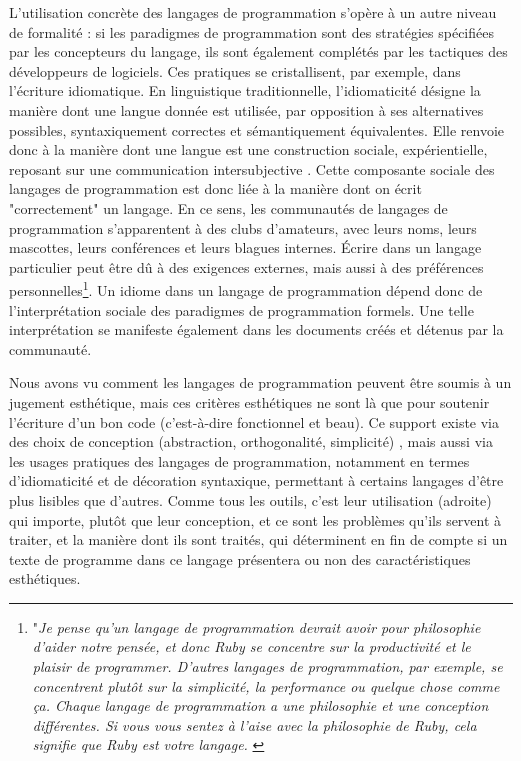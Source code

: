 \documentclass{article}
\begin{document}
L'utilisation concrète des langages de programmation s'opère à un autre niveau de formalité : si les paradigmes de programmation sont des stratégies spécifiées par les concepteurs du langage, ils sont également complétés par les tactiques des développeurs de logiciels. Ces pratiques se cristallisent, par exemple, dans l'écriture idiomatique. En linguistique traditionnelle, l'idiomaticité désigne la manière dont une langue donnée est utilisée, par opposition à ses alternatives possibles, syntaxiquement correctes et sémantiquement équivalentes. Elle renvoie donc à la manière dont une langue est une construction sociale, expérientielle, reposant sur une communication intersubjective \citep{voloshinov_marxism_1986}. Cette composante sociale des langages de programmation est donc liée à la manière dont on écrit "correctement" un langage. En ce sens, les communautés de langages de programmation s'apparentent à des clubs d'amateurs, avec leurs noms, leurs mascottes, leurs conférences et leurs blagues internes. Écrire dans un langage particulier peut être dû à des exigences externes, mais aussi à des préférences personnelles\footnote{"\emph{Je pense qu'un langage de programmation devrait avoir pour philosophie d'aider notre pensée, et donc Ruby se concentre sur la productivité et le plaisir de programmer. D'autres langages de programmation, par exemple, se concentrent plutôt sur la simplicité, la performance ou quelque chose comme ça. Chaque langage de programmation a une philosophie et une conception différentes. Si vous vous sentez à l'aise avec la philosophie de Ruby, cela signifie que Ruby est votre langage.} \citep{matsumoto_yukihiro_2019}}. Un idiome dans un langage de programmation dépend donc de l'interprétation sociale des paradigmes de programmation formels. Une telle interprétation se manifeste également dans les documents créés et détenus par la communauté.

Nous avons vu comment les langages de programmation peuvent être soumis à un jugement esthétique, mais ces critères esthétiques ne sont là que pour soutenir l'écriture d'un bon code (c'est-à-dire fonctionnel et beau). Ce support existe via des choix de conception (abstraction, orthogonalité, simplicité) \citep{stansifer_study_1994}, mais aussi via les usages pratiques des langages de programmation, notamment en termes d'idiomaticité et de décoration syntaxique, permettant à certains langages d'être plus lisibles que d'autres. Comme tous les outils, c'est leur utilisation (adroite) qui importe, plutôt que leur conception, et ce sont les problèmes qu'ils servent à traiter, et la manière dont ils sont traités, qui déterminent en fin de compte si un texte de programme dans ce langage présentera ou non des caractéristiques esthétiques.
\end{document}
